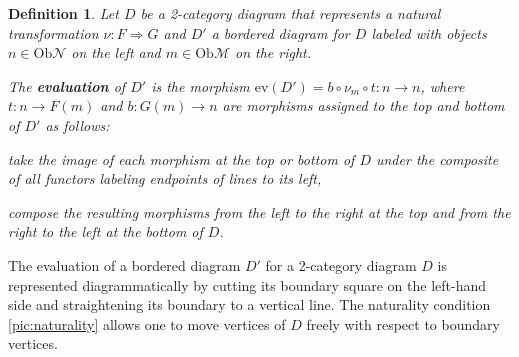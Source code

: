 \documentclass[1.5pt, a4paper]{article}
\newcommand{\mam}{\mathcal M}
\newcommand{\man}{\mathcal N}
\newcommand{\Ob}{\mathrm{Ob}}
\newcommand{\ev}{\mathrm{ev}}
\newtheorem{definition}[theorem]{Definition}
\begin{document}
\begin{definition} Let $D$ be a 2-category diagram that represents a natural transformation $\nu: F\Rightarrow G$ and $D'$ a bordered diagram for $D$ labeled with objects $n\in \Ob\man$ on the left and $m\in\Ob\mam$ on the right.

The {\bf evaluation} of $D'$  is the morphism 
$\ev(D')=b\circ \nu_m\circ t:n\to n$, where $t: n\to F(m)$ and $b: G(m)\to n$ are morphisms  assigned to the top and bottom of $D'$ as follows:
\begin{compactitem}
\item take the image of each morphism at the top or bottom of $D$ under the composite of all functors labeling endpoints of lines to its left,
\item compose the resulting morphisms from the left to the right at the top and from the right to the left at the bottom of $D$. 
\end{compactitem}
\end{definition}

The evaluation of   a bordered diagram  $D'$ for a 2-category diagram  $D$ is represented diagrammatically by cutting its boundary square on the left-hand side and straightening its boundary to a vertical line. The naturality condition \eqref{pic:naturality} allows one to move vertices of $D$ freely with respect to boundary vertices.
\end{document}
